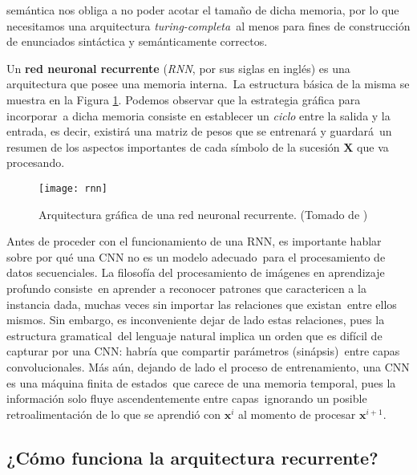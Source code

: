 semántica nos obliga a no poder acotar el tamaño de dicha memoria, por lo que necesitamos una arquitectura \emph{turing-completa}\
al menos para fines de construcción de enunciados sintáctica y semánticamente correctos.\par
Un \textbf{red neuronal recurrente} (\emph{RNN}, por sus siglas en inglés) es una arquitectura que posee una memoria interna.\
La estructura básica de la misma se muestra en la Figura \ref{recurrent_fig}. Podemos observar que la estrategia gráfica para incorporar\
a dicha memoria consiste en establecer un \emph{ciclo} entre la salida y la entrada, es decir, existirá una matriz de pesos que se entrenará y guardará\
un resumen de los aspectos importantes de cada símbolo de la sucesión $\mathbf{X}$ que va procesando.

\begin{figure}
  \centering
  \texttt{[image: rnn]}
  \caption{Arquitectura gráfica de una red neuronal recurrente.
    (Tomado de \cite{goodfellow-et-al-2016})}
  \label{recurrent_fig}
\end{figure}

Antes de proceder con el funcionamiento de una RNN, es importante hablar sobre por qué una CNN no es un modelo adecuado\
para el procesamiento de datos secuenciales. La filosofía del procesamiento de imágenes en aprendizaje profundo consiste\
en aprender a reconocer patrones que caractericen a la instancia dada, muchas veces sin importar las relaciones que existan\
entre ellos mismos. Sin embargo, es inconveniente dejar de lado estas relaciones, pues la estructura gramatical\
del lenguaje natural implica un orden que es difícil de capturar por una CNN: habría que compartir parámetros (sinápsis)\
entre capas convolucionales. Más aún, dejando de lado el proceso de entrenamiento, una CNN es una máquina finita de estados\
que carece de una memoria temporal, pues la información solo fluye ascendentemente entre capas\
ignorando un posible retroalimentación de lo que se aprendió con $\mathbf{x}^i$ al momento de procesar $\mathbf{x}^{i+1}$.

\subsection{¿Cómo funciona la arquitectura recurrente?}

